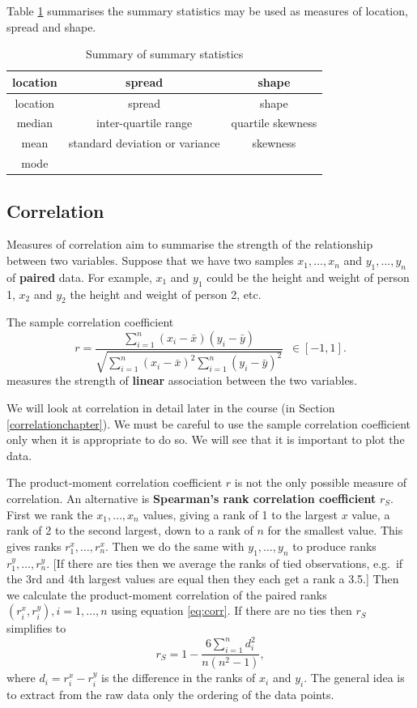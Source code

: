 \documentclass[
  british,
]{book}
\begin{document}
Table \ref{tab:sumstats} summarises the summary statistics may be used as measures of location, spread and shape.

\begin{longtable}[]{@{}ccc@{}}
\caption{\label{tab:sumstats} Summary of summary statistics}\tabularnewline
\toprule
location & spread & shape\tabularnewline
\midrule
\endfirsthead
\toprule
location & spread & shape\tabularnewline
\midrule
\endhead
median & inter-quartile range & quartile skewness\tabularnewline
mean & standard deviation or variance & skewness\tabularnewline
mode & &\tabularnewline
\bottomrule
\end{longtable}

\hypertarget{correlation}{%
\subsection{Correlation}\label{correlation}}

Measures of correlation aim to summarise the strength of the relationship between two variables. Suppose that we have two samples \(x_1,\ldots,x_n\) and \(y_1,\ldots,y_n\) of \textbf{paired} data. For example, \(x_1\) and \(y_1\) could be the height and weight of person 1, \(x_2\) and \(y_2\) the height and weight of person 2, etc.

The sample correlation coefficient
\begin{equation}
r = \frac{\displaystyle\sum_{i=1}^n (x_i-\bar{x})(y_i-
\bar{y})}{\sqrt{\displaystyle\sum_{i=1}^n (x_i-\bar{x})^2 \displaystyle\sum_{i=1}^n(y_i-
\bar{y})^2}} \,\,\, \in [-1, 1]. 
\label{eq:corr}
\end{equation}
measures the strength of \textbf{linear} association between the two variables.

We will look at correlation in detail later in the course (in Section \ref{correlationchapter}). We must be careful to use the sample correlation coefficient only when it is appropriate to do so. We will see that it is important to plot the data.

The product-moment correlation coefficient \(r\) is not the only possible measure of correlation. An alternative is \textbf{Spearman's rank correlation coefficient} \(r_S\). First we rank the \(x_1,\ldots,x_n\) values, giving a rank of 1 to the largest \(x\) value, a rank of 2 to the second largest, down to a rank of \(n\) for the smallest value. This gives ranks \(r^x_1, \ldots, r^x_n\). Then we do the same with \(y_1,\ldots,y_n\) to produce ranks \(r^y_1, \ldots, r^y_n\). {[}If there are ties then we average the ranks of tied observations, e.g.~if the 3rd and 4th largest values are equal then they each get a rank a 3.5.{]} Then we calculate the product-moment correlation of the paired ranks\((r^x_i, r^y_i), i=1,\ldots,n\) using equation \eqref{eq:corr}. If there are no ties then \(r_S\) simplifies to
\[r_S = 1- \frac{6\displaystyle\sum_{i=1}^n d_i^2}{n(n^2-1)}, \]
where \(d_i=r^x_i-r^y_i\) is the difference in the ranks of \(x_i\) and \(y_i\). The general idea is to extract from the raw data only the ordering of the data points.
\end{document}
